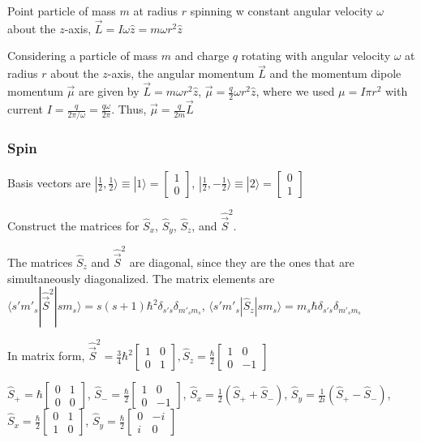 Point particle of mass $m$ at radius $r$ spinning w constant angular velocity $\omega$ about the $z$-axis, $\vec{L} = I \omega \widehat{z} = m \omega r^2 \widehat{z}$

Considering a particle of mass $m$ and charge $q$ rotating with angular velocity $\omega$ at radius $r$ about the $z$-axis, the angular momentum $\vec{L}$ and the momentum dipole momentum $\vec{\mu}$ are given by $\vec{L} = m \omega r^2 \widehat{z}$, $\vec{\mu} = \frac{q}{2} \omega r^2 \widehat{z}$, where we used $\mu = I \pi r^2$ with current $I = \frac{q}{2 \pi / \omega} = \frac{q \omega}{2 \pi}$. Thus, $\vec{\mu} = \frac{q}{2m} \vec{L}$

\subsubsection{Spin} \hfill

Basis vectors are $| \frac{1}{2}, \frac{1}{2} \rangle \equiv | 1 \rangle = \begin{bmatrix} 1 \\ 0 \end{bmatrix}$, $| \frac{1}{2}, -\frac{1}{2} \rangle \equiv | 2 \rangle = \begin{bmatrix} 0 \\ 1 \end{bmatrix}$

Construct the matrices for $\widehat{S}_x$, $\widehat{S}_y$, $\widehat{S}_z$, and $\widehat{\vec{S}}^2$. 

The matrices $\widehat{S}_z$ and $\widehat{\vec{S}}^2$ are diagonal, since they are the ones that are simultaneously diagonalized. The matrix elements are $\langle s' m'_s | \widehat{\vec{S}}^2 | sm_s \rangle = s(s+1) \hbar^2 \delta_{s' s} \delta_{m'_s m_s}$, $\langle s' m'_s | \widehat{S}_z | sm_s \rangle = m_s \hbar \delta_{s' s} \delta_{m'_s m_s}$

In matrix form, $\widehat{\vec{S}}^2 = \frac{3}{4} \hbar^2 \begin{bmatrix} 1 & 0 \\ 0 & 1 \end{bmatrix}, \widehat{S}_z = \frac{\hbar}{2} \begin{bmatrix} 1 & 0 \\ 0 & -1 \end{bmatrix}$

$\widehat{S}_{+} = \hbar \begin{bmatrix} 0 & 1 \\ 0 & 0 \end{bmatrix}$, $\widehat{S}_{-} = \frac{\hbar}{2} \begin{bmatrix} 1 & 0 \\ 0 & -1 \end{bmatrix}$, $\widehat{S}_x = \frac{1}{2}(\widehat{S}_{+} + \widehat{S}_{-})$, $\widehat{S}_y = \frac{1}{2i}(\widehat{S}_{+} - \widehat{S}_{-})$, $\widehat{S}_x = \frac{\hbar}{2} \begin{bmatrix} 0 & 1 \\ 1 & 0 \end{bmatrix}$, $\widehat{S}_y = \frac{\hbar}{2} \begin{bmatrix} 0 & -i \\ i & 0 \end{bmatrix}$

